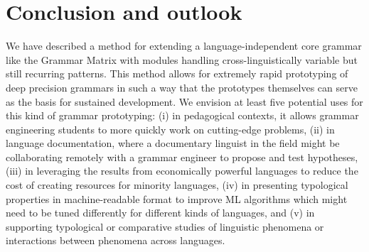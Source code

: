 \documentclass[11pt]{article}
\begin{document}
\section{Conclusion and outlook}

We have described a method for extending a language-independent core
grammar like the Grammar Matrix with modules handling
cross-linguistically variable but still recurring patterns.  This
method allows for extremely rapid prototyping of deep precision
grammars in such a way that the prototypes themselves can serve as the
basis for sustained development.  We envision at least five potential
uses for this kind of grammar prototyping: (i) in pedagogical
contexts, it allows grammar engineering students to more quickly work
on cutting-edge problems, (ii) in language documentation, where a
documentary linguist in the field might be collaborating remotely with
a grammar engineer to propose and test hypotheses, (iii) in leveraging
the results from economically powerful languages to reduce the cost of
creating resources for minority languages, (iv) in presenting
typological properties in machine-readable format to improve ML
algorithms which might need to be tuned differently for different
kinds of languages, and (v) in supporting typological or comparative
studies of linguistic phenomena or interactions between phenomena across
languages.



%

\end{document}

